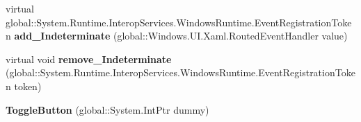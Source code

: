 \begin{DoxyCompactItemize}
\item 
\mbox{\label{class_windows_1_1_u_i_1_1_xaml_1_1_controls_1_1_primitives_1_1_toggle_button_a1f1913eba8709563eba2ffc6ada7b337}} 
virtual global\+::\+System.\+Runtime.\+Interop\+Services.\+Windows\+Runtime.\+Event\+Registration\+Token {\bfseries add\+\_\+\+Indeterminate} (global\+::\+Windows.\+U\+I.\+Xaml.\+Routed\+Event\+Handler value)
\item 
\mbox{\label{class_windows_1_1_u_i_1_1_xaml_1_1_controls_1_1_primitives_1_1_toggle_button_af20454c3f1b1b6b81eb8483851df5397}} 
virtual void {\bfseries remove\+\_\+\+Indeterminate} (global\+::\+System.\+Runtime.\+Interop\+Services.\+Windows\+Runtime.\+Event\+Registration\+Token token)
\item 
\mbox{\label{class_windows_1_1_u_i_1_1_xaml_1_1_controls_1_1_primitives_1_1_toggle_button_a49287addc0d795495badcb684663bfbb}} 
{\bfseries Toggle\+Button} (global\+::\+System.\+Int\+Ptr dummy)
\end{DoxyCompactItemize}
